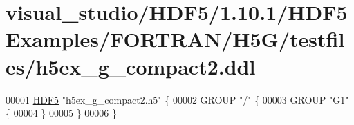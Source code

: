 \hypertarget{visual__studio_2_h_d_f5_21_810_81_2_h_d_f5_examples_2_f_o_r_t_r_a_n_2_h5_g_2testfiles_2h5ex__g__compact2_8ddl_source}{}\section{visual\+\_\+studio/\+H\+D\+F5/1.10.1/\+H\+D\+F5\+Examples/\+F\+O\+R\+T\+R\+A\+N/\+H5\+G/testfiles/h5ex\+\_\+g\+\_\+compact2.ddl}
\label{visual__studio_2_h_d_f5_21_810_81_2_h_d_f5_examples_2_f_o_r_t_r_a_n_2_h5_g_2testfiles_2h5ex__g__compact2_8ddl_source}

\begin{DoxyCode}
00001 \hyperlink{namespace_h_d_f5}{HDF5} \textcolor{stringliteral}{"h5ex\_g\_compact2.h5"} \{
00002 GROUP \textcolor{stringliteral}{"/"} \{
00003    GROUP \textcolor{stringliteral}{"G1"} \{
00004    \}
00005 \}
00006 \}
\end{DoxyCode}
